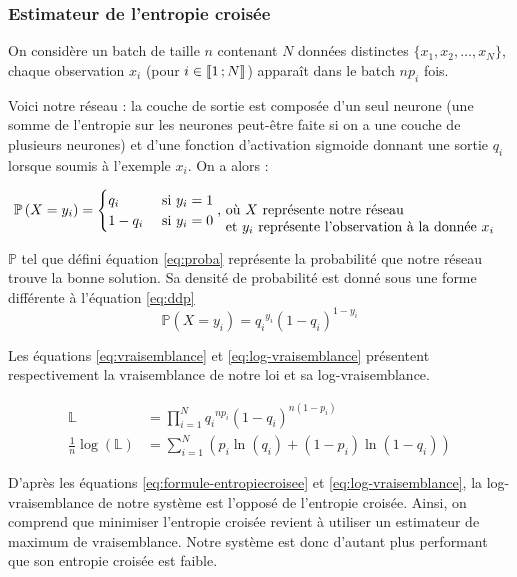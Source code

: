 \subsubsection{Estimateur de l'entropie croisée}

On considère un batch de taille $n$ contenant $N$ données distinctes $\{x_1, x_2, \ldots, x_N\}$, chaque observation $x_i$ 
(pour $i \in \mathopen{\llbracket}1\,;N\mathclose{\rrbracket}$) apparaît dans le batch $np_i$ fois.

Voici notre réseau : la couche de sortie est composée d'un seul neurone (une somme de l'entropie sur les neurones peut-être faite si 
on a une couche de plusieurs neurones) et d'une fonction d'activation sigmoide donnant une sortie $q_i$ lorsque soumis à l'exemple $x_i$. On a alors :

\begin{equation}
 \mathbb{P}\left(X=y_i\right) = \begin{cases}q_i &\text{ si $y_i=1$}\\1-q_i &\text{ si $y_i=0$}\end{cases} \text{, \parbox[t]{20em}{où $X$ représente notre réseau\\
 et $y_i$ représente l'observation à la donnée $x_i$}}
 \label{eq:proba}
\end{equation}

$\mathbb{P}$ tel que défini équation \ref{eq:proba} représente la probabilité que notre réseau trouve la bonne solution. Sa densité de probabilité
est donné sous une forme différente à l'équation \ref{eq:ddp}
\begin{equation}
 \label{eq:ddp}
 \mathbb{P}\left(X=y_i\right) = q_i{^{y_i}}\left(1-q_i\right)^{1-y_i}
\end{equation}

Les équations \ref{eq:vraisemblance} et \ref{eq:log-vraisemblance} présentent respectivement la vraisemblance de notre loi et sa log-vraisemblance.

\begin{align}
 \mathbb{L} &= \prod_{i=1}^N q_i{^{np_i}}\left(1-q_i\right)^{n(1-p_i)}
 \label{eq:vraisemblance}\\
 \frac{1}{n}\log\left(\mathbb{L}\right) &= \sum_{i=1}^N \left(p_i\ln\left(q_i\right) + \left(1-p_i\right)\ln\left(1-q_i\right) \right)
 \label{eq:log-vraisemblance}
\end{align}

D'après les équations \ref{eq:formule-entropiecroisee} et \ref{eq:log-vraisemblance}, la log-vraisemblance de notre système est l'opposé de l'entropie croisée. 
Ainsi, on comprend que minimiser l'entropie croisée revient à utiliser un estimateur de maximum de vraisemblance. 
Notre système est donc d'autant plus performant que son entropie croisée est faible.






